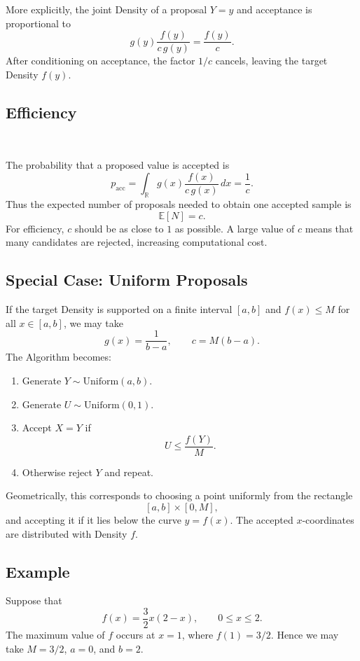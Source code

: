 \documentclass[a4paper, 10pt, onepage]{elegantbook}
\begin{document}
{More explicitly, the joint Density of a proposal \(Y=y\) and acceptance is
proportional to
\[
g(y)\frac{f(y)}{c\,g(y)}
=
\frac{f(y)}{c}.
\]
After conditioning on acceptance, the factor \(1/c\) cancels, leaving the
target Density \(f(y)\).

\subsection{Efficiency}\

\noindent

The probability that a proposed value is accepted is
\[
p_{\mathrm{acc}}
=
\int_{\mathbb{R}}g(x)\frac{f(x)}{c\,g(x)}\,dx
=
\frac{1}{c}.
\]
Thus the expected number of proposals needed to obtain one accepted sample
is
\[
\mathbb{E}[N]=c.
\]
For efficiency, \(c\) should be as close to \(1\) as possible. A large value
of \(c\) means that many candidates are rejected, increasing computational
cost.

\subsection{Special Case: Uniform Proposals}

\noindent

If the target Density is supported on a finite interval \([a,b]\) and
\(f(x)\leq M\) for all \(x\in[a,b]\), we may take
\[
g(x)=\frac{1}{b-a},
\qquad c=M(b-a).
\]
The Algorithm becomes:

\begin{enumerate}
    \item Generate \(Y\sim\mathrm{Uniform}(a,b)\).
    \item Generate \(U\sim\mathrm{Uniform}(0,1)\).
    \item Accept \(X=Y\) if
    \[
    U\leq\frac{f(Y)}{M}.
    \]
    \item Otherwise reject \(Y\) and repeat.
\end{enumerate}

Geometrically, this corresponds to choosing a point uniformly from the
rectangle
\[
[a,b]\times[0,M],
\]
and accepting it if it lies below the curve \(y=f(x)\). The accepted
\(x\)-coordinates are distributed with Density \(f\).

\subsection{Example}

\noindent

Suppose that
\[
f(x)=\frac{3}{2}x(2-x),
\qquad 0\leq x\leq2.
\]
The maximum value of \(f\) occurs at \(x=1\), where \(f(1)=3/2\). Hence we
may take \(M=3/2\), \(a=0\), and \(b=2\).

}
\end{document}
